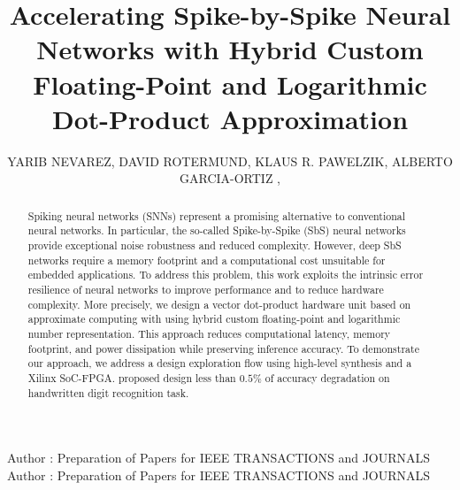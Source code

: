 \title {Accelerating Spike-by-Spike Neural Networks  with Hybrid Custom Floating-Point and Logarithmic Dot-Product Approximation }

\author{
	\uppercase{Yarib Nevarez},	
	\uppercase{David Rotermund},
	\uppercase{Klaus R. Pawelzik},
	\uppercase{Alberto Garcia-Ortiz} ,
}

\address[1]{Institute of Electrodynamics and Microelectronics, University of Bremen, Bremen 28359, Germany (e-mail: nevarez@item.uni-bremen.de)}

\address[2]{Institute for Theoretical Physics, University of Bremen, Bremen 28359, Germany (e-mail: davrot@neuro.uni-bremen.de)}

\address[3]{Institute for Theoretical Physics, University of Bremen, Bremen 28359, Germany (e-mail: pawelzik@neuro.uni-bremen.de)}

\address[4]{Institute of Electrodynamics and Microelectronics, University of Bremen, Bremen 28359, Germany (e-mail: agarcia@item.uni-bremen.de)}


\markboth
{Author \headeretal: Preparation of Papers for IEEE TRANSACTIONS and JOURNALS}
{Author \headeretal: Preparation of Papers for IEEE TRANSACTIONS and JOURNALS}


\begin{abstract}
  Spiking neural networks (SNNs) represent a promising alternative to
  conventional neural networks. In particular, the so-called
  Spike-by-Spike (SbS) neural networks provide exceptional noise
  robustness and reduced complexity. However, deep SbS networks
  require a memory footprint and a computational cost unsuitable for
  embedded applications. To address this problem, this work exploits
  the intrinsic error resilience of neural networks to improve
  performance and to reduce hardware complexity. More precisely,
  we design a vector dot-product hardware unit based on approximate computing
  with 
  using hybrid custom floating-point and logarithmic number
  representation. This approach reduces computational latency, memory
  footprint, and power dissipation while preserving inference
  accuracy. To demonstrate our approach, we address a design
  exploration flow using high-level synthesis and a Xilinx SoC-FPGA.
   proposed design  less than
  $0.5\%$ of accuracy degradation on  handwritten digit
  recognition task.
	
\end{abstract}

